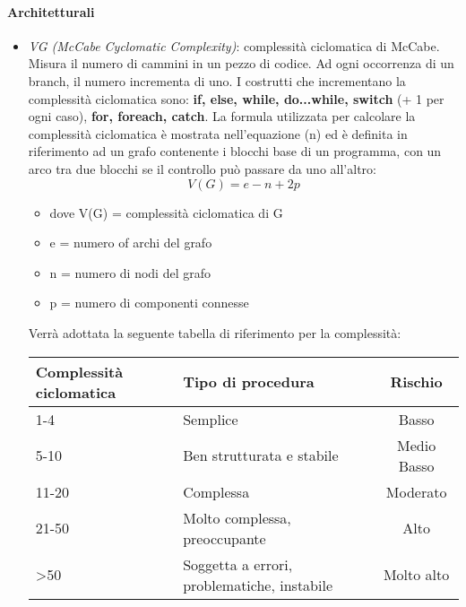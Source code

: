 {\paragraph{Architetturali}\hbox{}
\begin{itemize}
       \item \textit{VG (McCabe Cyclomatic Complexity)}: complessità ciclomatica di McCabe. Misura il numero di cammini in un pezzo di codice. Ad ogni occorrenza di un branch, il numero 
	      incrementa di uno. I costrutti che incrementano la complessità ciclomatica sono: \textbf{if, else, while, do...while, switch} (+ 1 per ogni caso), \textbf{for, foreach, catch}.
	      La formula utilizzata per calcolare la complessità ciclomatica è mostrata nell’equazione (n) ed è definita in riferimento ad un grafo contenente i blocchi base di un 
	      programma, con un arco tra due blocchi se il controllo può passare da uno all’altro:
	      \begin{equation}
			      V(G) = e-n+2p
	      \end{equation}

	      \begin{itemize}
		    \item[] dove V(G) = complessità ciclomatica di G
		    \item[] e = numero of archi del grafo
		    \item[] n = numero di nodi del grafo
		    \item[] p = numero di componenti connesse
	      \end{itemize}
	      Verrà adottata la seguente tabella di riferimento per la complessità:\\
	      \begin{table}[h!]
		      \begin{center}
			      \begin{tabular}{l l c}				
				      \toprule
				      Complessità ciclomatica&	 Tipo di procedura &	 Rischio \\ 
				      \midrule
				      1-4 & Semplice &	Basso\\
				      5-10 & Ben strutturata e stabile &	Medio Basso\\
				      11-20 & Complessa &	Moderato\\
				      21-50 & Molto complessa, preoccupante &	Alto\\
				      \textgreater 50 & Soggetta a errori, problematiche, instabile  &	Molto alto\\
				      

\end{tabular}
\end{center}
\end{table}
\end{itemize}}
